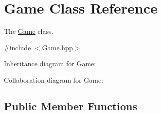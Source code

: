 \hypertarget{class_game}{}\section{Game Class Reference}
\label{class_game}


The \hyperlink{class_game}{Game} class.  




{\ttfamily \#include $<$Game.\+hpp$>$}



Inheritance diagram for Game\+:


Collaboration diagram for Game\+:
\subsection*{Public Member Functions}
